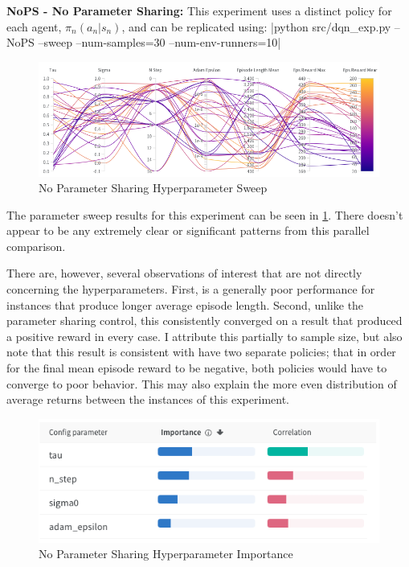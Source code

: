 \documentclass[12pt,letterpaper]{exam}
\begin{document}
\begin{questions}
    \question \textbf{NoPS - No Parameter Sharing:}
    This experiment uses a distinct policy for each agent, 
    \(\pi_n(a_n|s_n)\), and can be replicated using:
|python src/dqn_exp.py --NoPS --sweep --num-samples=30 --num-env-runners=10|
%
    \begin{figure}
        \centering
        \includegraphics[width=.95\linewidth]{para_coord_nops.png}
        \caption{No Parameter Sharing Hyperparameter Sweep}
        \label{fig:nops_para}
    \end{figure}
%
    The parameter sweep results for this experiment can be seen in 
    \cref{fig:nops_para}. There doesn't appear to be any extremely 
    clear or significant patterns from this parallel comparison.

    There are, however, several observations of interest that are not
    directly concerning the hyperparameters. First, is a generally poor 
    performance for instances that produce longer average episode length.
    Second, unlike the parameter sharing control, this consistently converged
    on a result that produced a positive reward in every case.
    I attribute this partially to sample size, but also note that this
    result is consistent with have two separate policies; that in order
    for the final mean episode reward to be negative, both policies would 
    have to converge to poor behavior.
    This may also explain the more even distribution of average returns
    between the instances of this experiment.

    \begin{figure}
        \centering
        \includegraphics[width=.5\linewidth]{importance_nops.png}
        \caption{No Parameter Sharing Hyperparameter Importance}
        \label{fig:nops_importance}
    \end{figure}


\end{questions}
\end{document}
